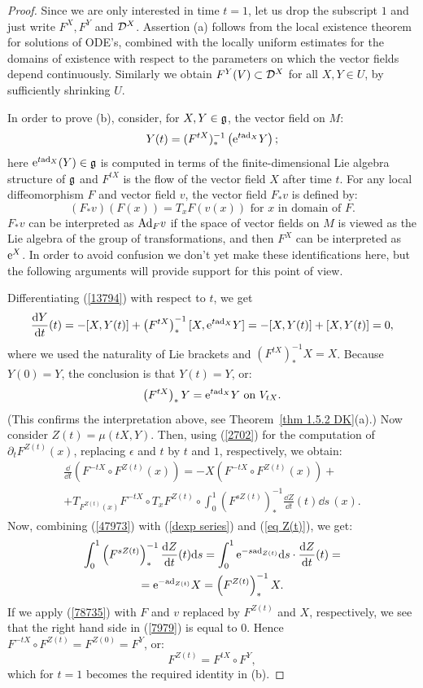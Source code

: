 \begin{proof}
    Since we are only interested in time $t=1$, let us drop the subscript $1$ and just write $F^X,F^Y$ and $\mathcal{D}^X$. Assertion (a) follows from the local existence theorem for solutions of ODE's, combined with the locally uniform estimates for the domains of existence with respect to the parameters on which the vector fields depend continuously. Similarly we obtain $F^Y(V)\subset \mathcal{D}^X$ for all $X,Y\in U$, by sufficiently shrinking $U$.

    In order to prove (b), consider, for $X,Y\in\mathfrak{g}$, the vector field on $M$:
    \[Y(t)=(F^{tX})_\ast^{-1}\left(\mathrm{e}^{t\mathrm{ad}_X}Y\right);\label{13794}\]
    here $\mathrm{e}^{t\mathrm{ad}_X}(Y)\in\mathfrak{g}$ is computed in terms of the finite-dimensional Lie algebra structure of $\mathfrak{g}$ and $F^{tX}$ is the flow of the vector field $X$ after time $t$. For any local diffeomorphism $F$ and vector field $v$, the vector field $F_\ast v$ is defined by:
    \[(F_\ast v)(F(x))=T_xF(v(x))\text{ for }x\text{ in domain of }F.\label{78735}\]
    $F_\ast v$ can be interpreted as $\mathrm{Ad}_F v$ if the space of vector fields on $M$ is viewed as the Lie algebra of the group of transformations, and then $F^X$ can be interpreted as $\mathrm{e}^X$. In order to avoid confusion we don't yet make these identifications here, but the following arguments will provide support for this point of view.

    Differentiating (\ref{13794}) with respect to $t$, we get
    \[\frac{{\mathrm{d}} Y}{{\mathrm{d}} t}(t)=-[X,Y(t)]+\left(F^{tX}\right)_\ast^{-1}[X,\mathrm{e}^{t\mathrm{ad}_X}Y]=-[X,Y(t)]+[X,Y(t)]=0,\]
    where we used the naturality of Lie brackets and $(F^{tX})_\ast^{-1}X=X$. Because $Y(0)=Y$, the conclusion is that $Y(t)=Y$, or:
    \[\left(F^{tX}\right)_\ast Y=\mathrm{e}^{t\mathrm{ad}_X}Y\text{ on }V_{tX}.\label{47973}\]
    (This confirms the interpretation above, see Theorem~\ref{thm 1.5.2 DK}(a).) Now consider $Z(t)=\mu(tX,Y)$. Then, using (\ref{2702}) for the computation of $\partial_t F^{Z(t)}(x)$, replacing $\epsilon$ and $t$ by $t$ and $1$, respectively, we obtain:
    \begin{multline}
        \frac{\dd}{\dd t}\left(F^{-tX}\circ F^{Z(t)}(x)\right)=-X\left(F^{-tX}\circ F^{Z(t)}(x)\right)+\\
        +T_{F^{Z(t)}(x)}F^{-tX}\circ T_xF^{Z(t)}\circ\int_0^1 \left(F^{sZ(t)}\right)_\ast^{-1}\frac{\dd Z}{\dd t}(t)\dd s\,(x).\label{7979}
    \end{multline}
    Now, combining (\ref{47973}) with (\ref{dexp series}) and (\ref{eq Z(t)}), we get:
    \begin{multline}
        \int_0^1\left(F^{sZ(t)}\right)_\ast^{-1}\frac{{\mathrm{d}} Z}{{\mathrm{d}} t}(t){\mathrm{d}} s
        =\int_0^1 \mathrm{e}^{-s\mathrm{ad}_{Z(t)}}{\mathrm{d}} s \cdot \frac{{\mathrm{d}} Z}{{\mathrm{d}} t}(t)=\\
        =\mathrm{e}^{-\mathrm{ad}_{Z(t)}}X=\left(F^{Z(t)}\right)_\ast^{-1} X.
    \end{multline}
    If we apply (\ref{78735}) with $F$ and $v$ replaced by $F^{Z(t)}$ and $X$, respectively, we see that the right hand side in (\ref{7979}) is equal to $0$. Hence $F^{-tX}\circ F^{Z(t)}=F^{Z(0)}=F^Y$, or:
    \[F^{Z(t)}=F^{tX}\circ F^Y,\]
    which for $t=1$ becomes the required identity in (b).


\end{proof}
